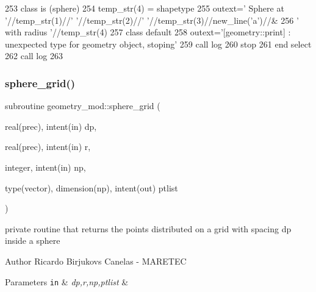 \begin{DoxyCode}
253 \textcolor{keywordflow}{    class is} (sphere)
254         temp\_str(4) = shapetype%
255         outext=\textcolor{stringliteral}{'      Sphere at '}//temp\_str(1)//\textcolor{stringliteral}{' '}//temp\_str(2)//\textcolor{stringliteral}{' '}//temp\_str(3)//new\_line(\textcolor{stringliteral}{'a'})//&
256                \textcolor{stringliteral}{'       with radius '}//temp\_str(4)        
257 \textcolor{keywordflow}{        class default}
258         outext=\textcolor{stringliteral}{'[geometry::print] : unexpected type for geometry object, stoping'}
259         \textcolor{keyword}{call }log%
260         stop
261 \textcolor{keywordflow}{    end select}
262     \textcolor{keyword}{call }log%
263 
\end{DoxyCode}
\mbox{\label{namespacegeometry__mod_a6c03a4ea3de6763940396dbeb3908ebc}} 
\subsubsection{\texorpdfstring{sphere\+\_\+grid()}{sphere\_grid()}}
{\footnotesize\ttfamily subroutine geometry\+\_\+mod\+::sphere\+\_\+grid (\begin{DoxyParamCaption}\item[{real(prec), intent(in)}]{dp,  }\item[{real(prec), intent(in)}]{r,  }\item[{integer, intent(in)}]{np,  }\item[{type(vector), dimension(np), intent(out)}]{ptlist }\end{DoxyParamCaption})\hspace{0.3cm}{\ttfamily [private]}}



private routine that returns the points distributed on a grid with spacing dp inside a sphere 

\begin{DoxyAuthor}{Author}
Ricardo Birjukovs Canelas -\/ M\+A\+R\+E\+T\+EC
\end{DoxyAuthor}

\begin{DoxyParams}[1]{Parameters}
\mbox{\tt in}  & {\em dp,r,np,ptlist} & \\
\hline
\end{DoxyParams}


